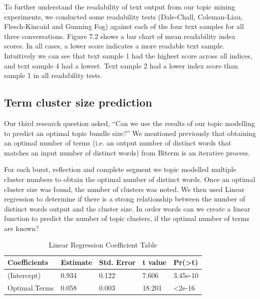 To further understand the readability of text output from our topic mining experiments, we conducted some readability tests (Dale-Chall, Coleman-Liau, Flesch-Kincaid and Gunning Fog) against each of the four text samples for all three conversations. Figure 7.2 shows a bar chart of mean readability index scores. In all cases, a lower score indicates a more readable text sample. Intuitively we can see that text sample 1 had the highest score across all indices, and text sample 4 had a lowest. Text sample 2 had a lower index score than sample 1 in all readability tests.

\subsection{Term cluster size prediction}

Our third research question asked, ``Can we use the results of our topic modelling to predict an optimal topic bundle size?'' We mentioned previously that obtaining an optimal number of terms (i.e. an output number of distinct words that matches an input number of distinct words) from Biterm is an iterative process. 

For each burst, reflection and complete segment we topic modelled multiple cluster numbers to obtain the optimal number of distinct words. Once an optimal cluster size was found, the number of clusters was noted. We then used Linear regression to determine if there is a strong relationship between the number of distinct words output and the cluster size. In order words can we create a linear function to predict the number of topic clusters, if the optimal number of terms are known?


\begin {table}[]
\caption {Linear Regression Coefficient Table} 
\label{tab:chapt7_study1_tab4}
\begin{center}
\begin{tabular}{| p{3cm} | p{2.2cm} | p{2.2cm} | p{2.2cm} | p{2.2cm} |} \hline \textbf{Coefficients} & \textbf{Estimate} & \textbf{Std. Error} & \textbf{t value} & \textbf{Pr(\textgreater t)} 
\\ \hline (Intercept) & 0.934 & 0.122 & 7.606 & 3.45e-10
\\ \hline Optimal.Terms & 0.058 & 0.003 & 18.201 & \textless 2e-16
\\ \hline
\end{tabular}
\end{center}
\end{table}

